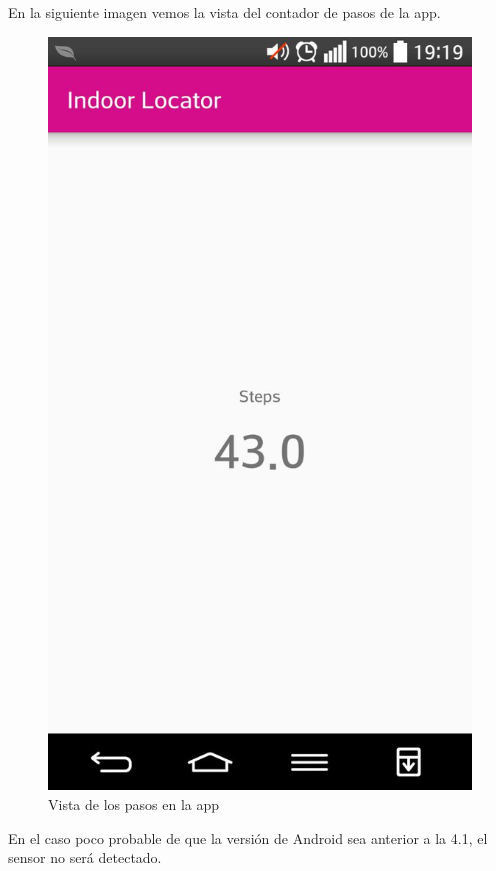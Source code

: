\documentclass[12pt, a4paper, titlepage]{article}
\begin{document}
        	En la siguiente imagen vemos la vista del contador de pasos de la app.
        	\begin{figure}[h!]
        		\begin{center}
        			\includegraphics[scale=0.25]{img/steps.png}
        			\caption{Vista de los pasos en la app}
        		\end{center}
        	\end{figure}

        	En el caso poco probable de que la versión de Android sea anterior a la 4.1, el sensor no será detectado.
\end{document}
